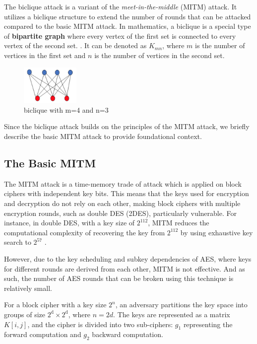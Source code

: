\documentclass{report}
\begin{document}
 

The biclique attack is a variant of the \emph{meet-in-the-middle} (MITM) attack. 
It utilizes a biclique structure to extend the number of rounds that can be attacked compared to the basic MITM attack. 
In mathematics, a biclique is a special type of \textbf{bipartite graph} where every vertex of the first set is connected to every vertex of the second set. \cite{wikipedia_bipartite_graph}. 
It can be denoted as \(K_{mn}\), where $m$ is the number of vertices in the first set and $n$ is the number of vertices in the second set. 

\begin{figure}[h]
    \centering
    \includegraphics[width=0.25\textwidth]{figures/1.jpg}
    \caption{biclique with m=4 and n=3}
    \label{fig:biclique with m=4 and n=3}
\end{figure}

Since the biclique attack builds on the principles of the MITM attack, we briefly describe the basic MITM attack to provide foundational context. 

\subsection{The Basic MITM}
The MITM attack is a time-memory trade of attack which is applied on block ciphers with independent key bits. This means that the keys used for encryption and decryption do not rely on each other, making block ciphers with multiple encryption rounds, such as double DES (2DES), particularly vulnerable. For instance, in double DES, with a key size of $2^{112}$, MITM reduces the computational complexity of recovering the key from $2^{112}$ by using exhaustive key search to $2^{57}$ \cite{wikipedia_meet_in_the_middle}. 

However, due to the key scheduling and subkey dependencies of AES, where keys for different rounds are derived from each other, MITM is not effective. And as such, the number of AES rounds that can be broken using this technique is relatively small. 

For a block cipher with a key size $2^n$, an adversary partitions the key space into groups of size $2^{\text{d}} \times 2^{\text{d}}$, where \(n = 2d\). The keys are represented as a matrix \(K[i, j]\), and the cipher is divided into two sub-ciphers\cite{bogdanov2011biclique}: $g_1$ representing the forward computation and $g_2$ backward computation. 
\end{document}
